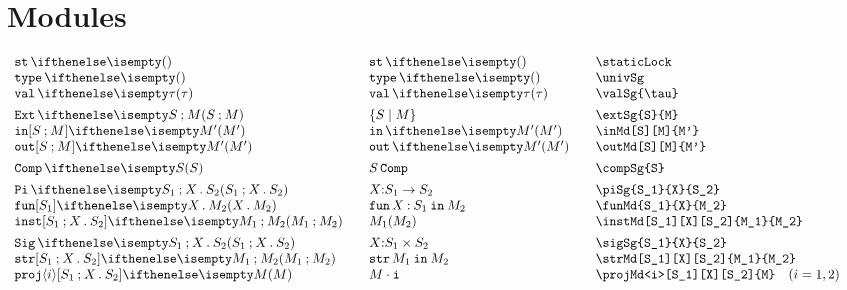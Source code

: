\documentclass[11pt]{article}
\begin{document}
\section*{Modules}
\begin{small}
  \begin{displaymath}
    \begin{array}{l@{\qquad}l@{\qquad}l@{\qquad}l}
      \staticLock                    & \staticLock*         & \verb|\staticLock|                              \\
      \univSg                        & \univSg*             & \verb|\univSg|                                  \\
      \valSg{\tau}                   & \valSg*{\tau}        & \verb|\valSg{\tau}|                             \\[1ex]
      \extSg{S}{M}                   & \extSg*{S}{M}        & \verb|\extSg{S}{M}|                             \\
      \inMd[S][M]{M'}                & \inMd*{M'}           & \verb|\inMd[S][M]{M'}|                          \\
      \outMd[S][M]{M'}               & \outMd*{M'}          & \verb|\outMd[S][M]{M'}|                         \\[1ex]
      \compSg{S}                     & \compSg*{S}          & \verb|\compSg{S}|                               \\[1ex]
      \piSg{S_1}{X}{S_2}             & \piSg*{S_1}{X}{S_2}  & \verb|\piSg{S_1}{X}{S_2}|                       \\
      \funMd{S_1}{X}{M_2}            & \funMd*{S_1}{X}{M_2} & \verb|\funMd{S_1}{X}{M_2}|                      \\
      \instMd[S_1][X][S_2]{M_1}{M_2} & \instMd*{M_1}{M_2}   & \verb|\instMd[S_1][X][S_2]{M_1}{M_2}|           \\[1ex]
      \sigSg{S_1}{X}{S_2}            & \sigSg*{S_1}{X}{S_2} & \verb|\sigSg{S_1}{X}{S_2}|                      \\
      \strMd[S_1][X][S_2]{M_1}{M_2}  & \strMd*{M_1}{M_2}    & \verb|\strMd[S_1][X][S_2]{M_1}{M_2}|            \\
      \projMd<i>[S_1][X][S_2]{M}     & \projMd*<i>{M}       & \verb|\projMd<i>[S_1][X][S_2]{M}| \quad (i=1,2)
    \end{array}
  \end{displaymath}
\end{small}
\end{document}
